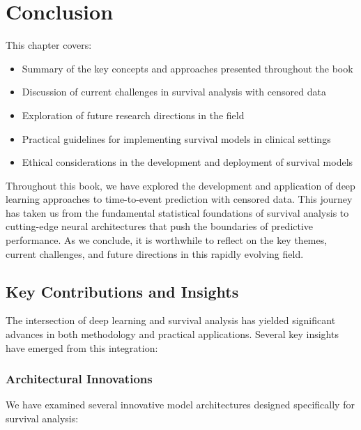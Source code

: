 \section{Conclusion}

\begin{notebox}[title=Chapter Overview]
This chapter covers:
\begin{itemize}
    \item Summary of the key concepts and approaches presented throughout the book
    \item Discussion of current challenges in survival analysis with censored data
    \item Exploration of future research directions in the field
    \item Practical guidelines for implementing survival models in clinical settings
    \item Ethical considerations in the development and deployment of survival models
\end{itemize}
\end{notebox}

Throughout this book, we have explored the development and application of deep learning approaches to time-to-event prediction with censored data. This journey has taken us from the fundamental statistical foundations of survival analysis to cutting-edge neural architectures that push the boundaries of predictive performance. As we conclude, it is worthwhile to reflect on the key themes, current challenges, and future directions in this rapidly evolving field.

\subsection{Key Contributions and Insights}

The intersection of deep learning and survival analysis has yielded significant advances in both methodology and practical applications. Several key insights have emerged from this integration:

\subsubsection{Architectural Innovations}

We have examined several innovative model architectures designed specifically for survival analysis:

